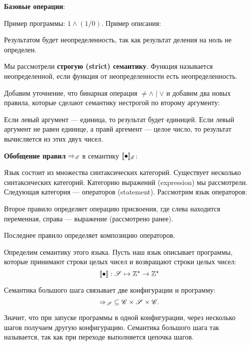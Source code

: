 \textbf{Базовые операции}:


Пример программы: $1 \land (1 / 0)$. Пример описания:


Результатом будет неопределенность, так как результат деления на ноль не
определен.

Мы рассмотрели \textbf{строгую (strict) семантику}. Функция называется
неопределенной, если функция от неопределенности есть неопределенность.

Добавим уточнение, что бинарная операция $ \neq \land \mid \lor$ и
добавим два новых правила, которые сделают семантику нестрогой по второму аргументу:


Если левый аргумент --- единица, то результат будет единицей. Если левый
аргумент не равен единице, а правй аргемент --- целое число, то результат
вычисляется из этих двух чисел.

\textbf{Обобщение правил} $\neatarrow_\Lexpr$ в семантику
$\llbracket \bullet \rrbracket_{\mathscr{E}}$:


Язык состоит из множества синтаксических категорий.
Существует несколько синтаксических категорий. Категорию выражений (expression) мы
рассмотрели. Следующая категория --- операторов (statement). Рассмотрим язык
операторов:


Второе правило определяет операцию присвоения, где слева находится переменная,
справа --- выражение (рассмотрено ранее).


Последнее правило определяет композицию операторов.

Определим семантику этого языка. Пусть наш язык описывает программы, которые
принимают строки целых чисел и возвращают строки целых чисел:
\[
    \llbracket \bullet \rrbracket : \mathscr{S} \mapsto \mathbb{Z}^\star \to
    \mathbb{Z}^\star
\]

Семантика большого шага связывает две конфигурации и программу:
\[
    \neatarrow_\Lstat\; \subseteq \mathscr{C} \times \Lstat \times
    \mathscr{C}.
\]

Значит, что при запуске программы в одной конфигурации, через несколько
шагов получаем другую конфигурацию. Семантика большого шага так называется, так
как при переходе выполняется цепочка шагов.

